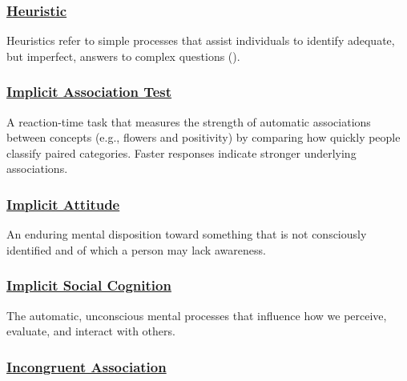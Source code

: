 \documentclass[
  letterpaper,
]{book}
\begin{document}
\subsubsection*{\texorpdfstring{\hyperref[def-heuristic]{Heuristic}}{Heuristic}}\label{heuristic}

Heuristics refer to simple processes that assist individuals to identify
adequate, but imperfect, answers to complex questions
().

\subsubsection*{\texorpdfstring{\hyperref[def-implicitassociationtest]{Implicit
Association
Test}}{Implicit Association Test}}\label{implicit-association-test}

A reaction-time task that measures the strength of automatic
associations between concepts (e.g., flowers and positivity) by
comparing how quickly people classify paired categories. Faster
responses indicate stronger underlying associations.

\subsubsection*{\texorpdfstring{\hyperref[def-implicitattitude]{Implicit
Attitude}}{Implicit Attitude}}\label{implicit-attitude}

An enduring mental disposition toward something that is not consciously
identified and of which a person may lack awareness.

\subsubsection*{\texorpdfstring{\hyperref[def-implicitsocialcognition]{Implicit
Social
Cognition}}{Implicit Social Cognition}}\label{implicit-social-cognition}

The automatic, unconscious mental processes that influence how we
perceive, evaluate, and interact with others.

\subsubsection*{\texorpdfstring{\hyperref[def-incongruentassociation]{Incongruent
Association}}{Incongruent Association}}\label{incongruent-association}
\end{document}
